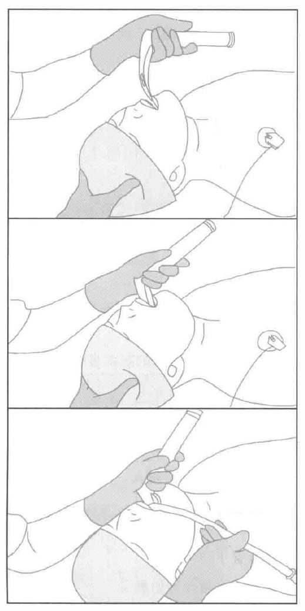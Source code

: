\documentclass[10pt]{article}
\begin{document}
\begin{center}
\includegraphics[max width=\textwidth]{2024_07_05_645bb794a4d4f32ee0c8g-290}
\end{center}
\end{document}
